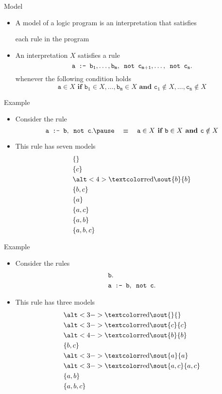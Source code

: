 \begin{frame}[c]{Model}
  \begin{itemize}
  \item A \alert{model} of a logic program is an interpretation that satisfies
    \par each rule in the program
    \smallskip
  \item<2-> An interpretation $X$ \alert{satisfies} a rule
    \[
      {\tt a\texttt{ :- } b_1,\dots,b_m,\texttt{ not }{c_{m+1}},\dots,\texttt{ not }{c_n}.}
    \]
    whenever the following condition holds
    \[
      \mathtt{a}\in X \textbf{ if } \mathtt{b_1}\in X,\dots,\mathtt{b_m}\in X\textbf{ and }\mathtt{c_1}\notin X,\dots,\mathtt{c_n}\notin X
    \]
  \end{itemize}
\end{frame}
\begin{frame}[c]{Example}
  \begin{itemize}
  \item Consider the rule
    \[
      {\tt a\texttt{ :- } b,\texttt{ not }c.}
      \pause\quad\equiv\quad
      \mathtt{a}\in X \textbf{ if } \mathtt{b}\in X\textbf{ and }\mathtt{c}\notin X
    \]
  \item <3-> This rule has seven models
    \begin{align*}
      &\{\}\\
      &\{c\}\\
      &\STROUT{4}{b}\\
      &\{b,c\}\\
      &\{a\}\\
      &\{a,c\}\\
      &\{a,b\}\\
      &\{a,b,c\}
    \end{align*}
  \end{itemize}
\end{frame}
\begin{frame}[c]{Example}
  \begin{itemize}
  \item Consider the rules
    \begin{align*}
      &{\tt b.}\\
      &{\tt a\texttt{ :- } b,\texttt{ not }c.}
    \end{align*}
  \item <2-> This rule has three models
    \begin{align*}
      &\STROUT{3-}{}\\
      &\STROUT{3-}{c}\\
      &\STROUT{4-}{b}\\
      &\{b,c\}\\
      &\STROUT{3-}{a}\\
      &\STROUT{3-}{a,c}\\
      &\{a,b\}\\
      &\{a,b,c\}
    \end{align*}
  \end{itemize}
\end{frame}
